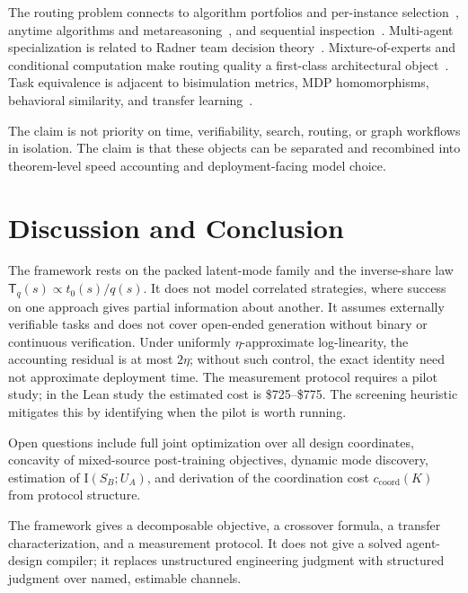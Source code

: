 \documentclass[10pt]{article}
\theoremstyle{paperplain}
\theoremstyle{paperdefinition}
\theoremstyle{paperremark}
\newcommand{\I}{\mathrm{I}}
\begin{document}
The routing problem connects to algorithm portfolios and per-instance selection~\cite{huberman_lukose_hogg_1997_economics_hard,xu_hutter_hoos_leytonbrown_2008_satzilla}, anytime algorithms and metareasoning~\cite{zilberstein_1996_anytime_systems,hansen_2001_monitoring_anytime,russell_wefald_1991_dotherightthing}, and sequential inspection~\cite{weitzman1979,wald1947,chernoff1959}. Multi-agent specialization is related to Radner team decision theory~\cite{radner1962,marschak_radner_1972}. Mixture-of-experts and conditional computation make routing quality a first-class architectural object~\cite{jordan_jacobs_1994_hme,shazeer_2017_moe,fedus_zoph_shazeer_2022_switch}. Task equivalence is adjacent to bisimulation metrics, MDP homomorphisms, behavioral similarity, and transfer learning~\cite{ferns2004,ravindran2003,agarwal2021,taylor2009}.

The claim is not priority on time, verifiability, search, routing, or graph workflows in isolation. The claim is that these objects can be separated and recombined into theorem-level speed accounting and deployment-facing model choice.

\section{Discussion and Conclusion}
\label{sec:discussion}

The framework rests on the packed latent-mode family and the inverse-share law $\mathsf{T}_q(s)\propto t_0(s)/q(s)$. It does not model correlated strategies, where success on one approach gives partial information about another. It assumes externally verifiable tasks and does not cover open-ended generation without binary or continuous verification. Under uniformly $\eta$-approximate log-linearity, the accounting residual is at most $2\eta$; without such control, the exact identity need not approximate deployment time.
The measurement protocol requires a pilot study; in the Lean study the estimated cost is \$725--\$775. The screening heuristic mitigates this by identifying when the pilot is worth running.

Open questions include full joint optimization over all design coordinates, concavity of mixed-source post-training objectives, dynamic mode discovery, estimation of $\I(S_B;U_A)$, and derivation of the coordination cost $c_{\mathrm{coord}}(K)$ from protocol structure.

The framework gives a decomposable objective, a crossover formula, a transfer characterization, and a measurement protocol. It does not give a solved agent-design compiler; it replaces unstructured engineering judgment with structured judgment over named, estimable channels.
\end{document}
